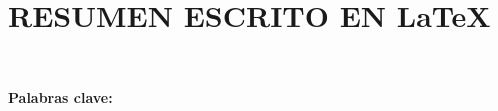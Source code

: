 \section{RESUMEN ESCRITO EN \LaTeX}

    \begin{justify}
        \lipsum[1-2][1-20]\\
    \end{justify}
    
    \begin{justify}
        \textbf{Palabras clave:} \lipsum[1][1] 
    \end{justify}
